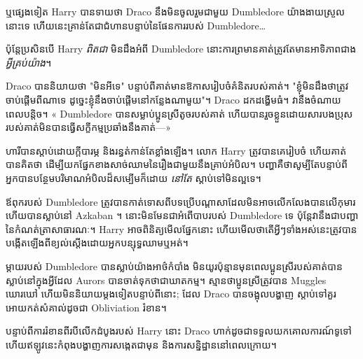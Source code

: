 {{{{{ឬផ្សេងទៀត Harry បានទាយថា Draco នឹងមិនចូលរួមជាមួយ Dumbledore យ៉ាងងាយស្រួលនោះទេ ហើយនេះគ្រាន់តែជាជំហានបន្ទាប់នៃផែនការរបស់ Dumbledore…

ប៉ុន្តែប្រសិនបើ Harry \emph{ពិតជា} មិនដឹងអំពី Dumbledore នោះការព្រមានគាត់ត្រូវតែមានអាទិភាពជាង\emph{អ្វីគ្រប់យ៉ាង}។

Draco បាននិយាយថា "មិនអីទេ" បន្ទាប់ពីគាត់មានឱកាសរៀបចំគំនិតរបស់គាត់។ "ខ្ញុំមិនដឹងថាត្រូវចាប់ផ្តើមពីណាទេ ដូច្នេះខ្ញុំនឹងចាប់ផ្តើមនៅកន្លែងណាមួយ"។ Draco ដកដង្ហើមធំ។ វានឹងចំណាយពេលបន្តិច។ « Dumbledore បាន​សម្លាប់​ប្អូនស្រី​តូច​របស់​គាត់ ហើយ​បាន​រួច​ខ្លួន​ដោយ​សារ​បង​ប្រុស​របស់​គាត់​មិន​បាន​ធ្វើ​សក្ខីកម្ម​ប្រឆាំង​នឹង​គាត់—»

\later

ហារីបានស្តាប់ដោយក្តីបារម្ភ និងរន្ធត់កាន់តែខ្លាំងឡើង។ លោក Harry ត្រូវបានគេរៀបចំ ហើយគាត់បានគិតថា ដើម្បីយកផ្នែកខាងសាច់ឈាមនៃរឿងជាមួយនឹងគ្រាប់អំបិល។ បញ្ហាគឺថាសូម្បីតែបន្ទាប់ពីអ្នកបានបន្ថែមបរិមាណអំបិលដ៏សម្បើមក៏ដោយ \emph{នៅតែ} ស្តាប់ទៅមិនល្អទេ។

ឪពុករបស់ Dumbledore ត្រូវបានកាត់ទោសពីបទប្រើបណ្តាសាដែលមិនអាចលើកលែងបានលើកុមារ ហើយបានស្លាប់នៅ Azkaban ។ នោះមិនមែនជាអំពើបាបរបស់ Dumbledore ទេ ប៉ុន្តែវានឹងជាបញ្ហានៃកំណត់ត្រាសាធារណៈ។ Harry អាចពិនិត្យមើលផ្នែកនោះ ហើយមើលថាតើអ្វីៗទាំងអស់នេះត្រូវបានបង្កើតឡើងពីខ្យល់ស្តើងដោយអ្នកបន្សុទ្ធឈាមឬអត់។

ម្តាយរបស់ Dumbledore បានស្លាប់យ៉ាងអាថ៌កំបាំង មិនយូរប៉ុន្មានមុនពេលប្អូនស្រីរបស់គាត់បានស្លាប់នៅក្នុងអ្វីដែល Aurors បានចាត់ទុកថាជាឃាតកម្ម។ ស្មានថាប្អូនស្រីត្រូវបាន Muggles ឃោរឃៅ ហើយមិននិយាយម្តងទៀតបន្ទាប់ពីនោះ; ដែល Draco បានចង្អុលបង្ហាញ ស្តាប់ទៅគួរអោយកត់សំគាល់ដូចជា Obliviation រំខាន។

បន្ទាប់ពីការរំខានពីរបីលើកដំបូងរបស់ Harry នោះ Draco ហាក់ដូចជាទទួលយកគោលការណ៍ទូទៅ ហើយឥឡូវនេះកំពុងបង្ហាញការសង្កេតជាមុន និងការសន្និដ្ឋាននៅពេលក្រោយ។

}}}}}

